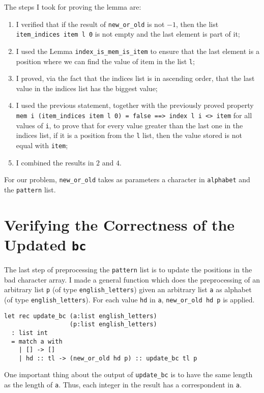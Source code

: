 The steps I took for proving the lemma are:
\begin{enumerate}
\item I verified that if the result of \texttt{new\_or\_old} is not \(-1\), then the list \texttt{item\_indices item l 0} is not empty and the last element is part of it;
\item I used the Lemma \texttt{index\_is\_mem\_is\_item} to ensure that the last element is a position where we can find the value of item in the list \texttt{l};
\item I proved, via the fact that the indices list is in ascending order, that the last value in the indices list has the biggest value;
\item I used the previous statement, together with the previously proved property \texttt{mem i (item\_indices item l 0) = false ==> index l i <> item} for all values of \texttt{i}, to prove that for every value greater than the last one in the indices list, if it is a position from the \texttt{l} list, then the value stored is not equal with \texttt{item};
\item I combined the results in \(2\) and \(4\).
\end{enumerate}

For our problem, \texttt{new\_or\_old} takes as parameters a character in \texttt{alphabet} and the \texttt{pattern} list.

\section{Verifying the Correctness of the Updated \texttt{bc}}

The last step of preprocessing the \texttt{pattern} list is to update the positions in the bad character array. I made a general function which does the preprocessing of an arbitrary list \texttt{p} (of type \texttt{english\_letters}) given an arbitrary list \texttt{a} as alphabet (of type \texttt{english\_letters}). For each value \texttt{hd} in \texttt{a}, \texttt{new\_or\_old hd p} is applied.

\begin{verbatim}
let rec update_bc (a:list english_letters) 
                  (p:list english_letters)
  : list int
  = match a with 
    | [] -> []
    | hd :: tl -> (new_or_old hd p) :: update_bc tl p
\end{verbatim}

One important thing about the output of \texttt{update\_bc} is to have the same length as the length of \texttt{a}. Thus, each integer in the result has a correspondent in \texttt{a}.

